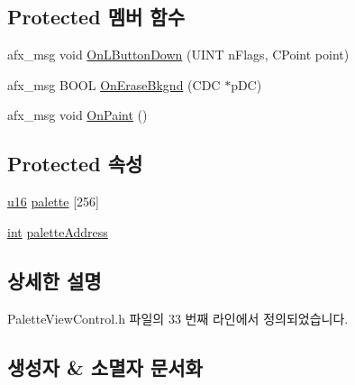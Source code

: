 \subsection*{Protected 멤버 함수}
\begin{DoxyCompactItemize}
\item 
afx\+\_\+msg void \mbox{\hyperlink{class_palette_view_control_a766a44e9b018fc6c87f81f3c0fdd6c6e}{On\+L\+Button\+Down}} (U\+I\+NT n\+Flags, C\+Point point)
\item 
afx\+\_\+msg B\+O\+OL \mbox{\hyperlink{class_palette_view_control_ac2086b2ba7161f3adb5ac76484f77cc9}{On\+Erase\+Bkgnd}} (C\+DC $\ast$p\+DC)
\item 
afx\+\_\+msg void \mbox{\hyperlink{class_palette_view_control_ab68c1927e30e1b35b207d6884ef9822d}{On\+Paint}} ()
\end{DoxyCompactItemize}
\subsection*{Protected 속성}
\begin{DoxyCompactItemize}
\item 
\mbox{\hyperlink{_system_8h_a9e6c91d77e24643b888dbd1a1a590054}{u16}} \mbox{\hyperlink{class_palette_view_control_a1a5ce1812cf6c8d26889f4eb03d1d4ec}{palette}} \mbox{[}256\mbox{]}
\item 
\mbox{\hyperlink{_util_8cpp_a0ef32aa8672df19503a49fab2d0c8071}{int}} \mbox{\hyperlink{class_palette_view_control_a53b2efd4174e06a68e545608e458947b}{palette\+Address}}
\end{DoxyCompactItemize}


\subsection{상세한 설명}


Palette\+View\+Control.\+h 파일의 33 번째 라인에서 정의되었습니다.



\subsection{생성자 \& 소멸자 문서화}
\mbox{\label{class_palette_view_control_ae7bc315eab0f7925e3c45b063244098b}} 
